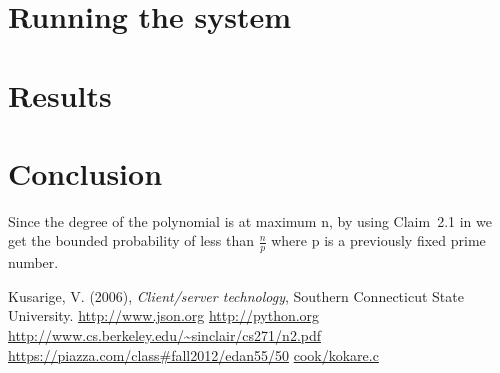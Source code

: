 \documentclass{article}
\begin{document}
\section{Running the system}

\section{Results}

\section{Conclusion}

Since the degree of the polynomial is at maximum n, by using Claim~2.1 in \cite[p.~2-1]{alistair} we get the bounded probability of less than $\frac{n}{p}$ where p is a previously fixed prime number.

\newpage

\begin{thebibliography}{9}
Kusarige, V. (2006), \emph{Client/server technology}, Southern Connecticut State University.
\url{http://www.json.org}
\url{http://python.org}
\url{http://www.cs.berkeley.edu/~sinclair/cs271/n2.pdf}
\url{https://piazza.com/class#fall2012/edan55/50}
\url{cook/kokare.c}
\end{thebibliography}
\end{document}
